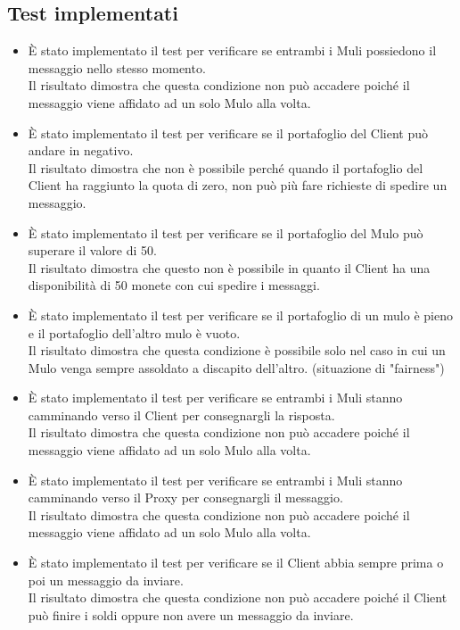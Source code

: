 \documentclass[13pt,a4paper]{article}
\begin{document}
\subsection{Test implementati}
\begin{itemize}
	\item È stato implementato il test per verificare se entrambi i Muli possiedono il messaggio nello stesso momento.\\
	Il risultato dimostra che questa condizione non può accadere poiché il messaggio viene affidato ad un solo Mulo alla volta.
	\item È stato implementato il test per verificare se il portafoglio del Client può andare in negativo.\\
	Il risultato dimostra che non è possibile perché quando il portafoglio del Client ha raggiunto la quota di zero, non può più fare richieste di spedire un messaggio.
	\item È stato implementato il test per verificare se il portafoglio del Mulo può superare il valore di 50.\\
	Il risultato dimostra che questo non è possibile in quanto il Client ha una disponibilità di 50 monete con cui spedire i messaggi. 
	\item È stato implementato il test per verificare se il portafoglio di un mulo è pieno e il portafoglio dell'altro mulo è vuoto. \\
	Il risultato dimostra che questa condizione è possibile solo nel caso in cui un Mulo venga sempre assoldato a discapito dell'altro. (situazione di "fairness")
	\item  È stato implementato il test per verificare se entrambi i Muli stanno camminando verso il Client per consegnargli la risposta.\\
	Il risultato dimostra che questa condizione non può accadere poiché il messaggio viene affidato ad un solo Mulo alla volta.
	\item  È stato implementato il test per verificare se entrambi i Muli stanno camminando verso il Proxy per consegnargli il messaggio.\\
	Il risultato dimostra che questa condizione non può accadere poiché il messaggio viene affidato ad un solo Mulo alla volta.
	\item È stato implementato il test per verificare se  il Client abbia sempre prima o poi un messaggio da inviare.\\
	Il risultato dimostra che questa condizione non può accadere poiché il Client può finire i soldi oppure non avere un messaggio da inviare.

\end{itemize}
\end{document}
